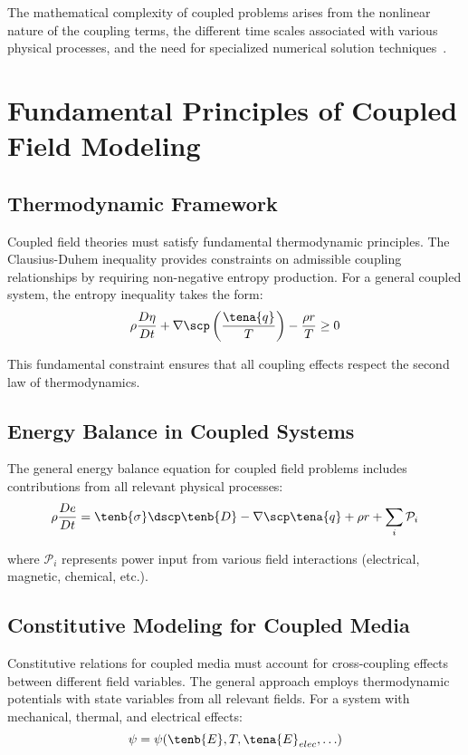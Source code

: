 The mathematical complexity of coupled problems arises from the nonlinear nature of the coupling terms, the different time scales associated with various physical processes, and the need for specialized numerical solution techniques~\autocite{Sadd.2019}.

\section{Fundamental Principles of Coupled Field Modeling}

\subsection{Thermodynamic Framework}

Coupled field theories must satisfy fundamental thermodynamic principles. The Clausius-Duhem inequality provides constraints on admissible coupling relationships by requiring non-negative entropy production. For a general coupled system, the entropy inequality takes the form:
\begin{equation}
\rho \frac{D\eta}{Dt} + \nabla \scp \left(\frac{\tena{q}}{T}\right) - \frac{\rho r}{T} \geq 0
\end{equation}

This fundamental constraint ensures that all coupling effects respect the second law of thermodynamics.

\subsection{Energy Balance in Coupled Systems}

The general energy balance equation for coupled field problems includes contributions from all relevant physical processes:
\begin{equation}
\rho \frac{De}{Dt} = \tenb{\sigma} \dscp \tenb{D} - \nabla \scp \tena{q} + \rho r + \sum_i \mathcal{P}_i
\end{equation}

where $\mathcal{P}_i$ represents power input from various field interactions (electrical, magnetic, chemical, etc.).

\subsection{Constitutive Modeling for Coupled Media}

Constitutive relations for coupled media must account for cross-coupling effects between different field variables. The general approach employs thermodynamic potentials with state variables from all relevant fields. For a system with mechanical, thermal, and electrical effects:
\begin{equation}
\psi = \psi(\tenb{E}, T, \tena{E}_{elec}, \ldots)
\end{equation}

